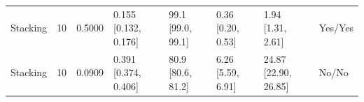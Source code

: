 \begin{longtable}{llllllll}
Stacking & 10 & 0.5000 & \shortstack{{0.155} \\ {[0.132, 0.176]}} & \shortstack{{99.1} \\ {[99.0, 99.1]}} & \shortstack{{0.36} \\ {[0.20, 0.53]}} & \shortstack{{1.94} \\ {[1.31, 2.61]}} & Yes/Yes \\
Stacking & 10 & 0.0909 & \shortstack{{0.391} \\ {[0.374, 0.406]}} & \shortstack{{80.9} \\ {[80.6, 81.2]}} & \shortstack{{6.26} \\ {[5.59, 6.91]}} & \shortstack{{24.87} \\ {[22.90, 26.85]}} & No/No \\
\bottomrule
\end{longtable}
\endgroup
